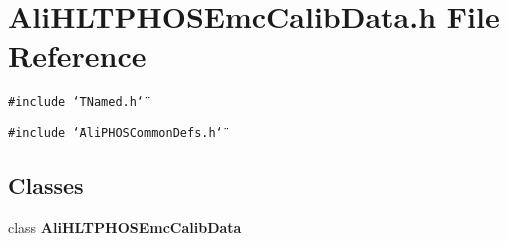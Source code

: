 \section{Ali\-HLTPHOSEmc\-Calib\-Data.h File Reference}
\label{AliHLTPHOSEmcCalibData_8h}
{\tt \#include \char`\"{}TNamed.h\char`\"{}}\par
{\tt \#include \char`\"{}Ali\-PHOSCommon\-Defs.h\char`\"{}}\par
\subsection*{Classes}
\begin{CompactItemize}
\item 
class {\bf Ali\-HLTPHOSEmc\-Calib\-Data}
\end{CompactItemize}
